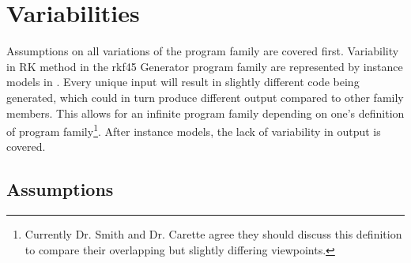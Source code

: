 \documentclass[12pt]{article}
\newcommand{\famname}{rkf45 Generator} %
\begin{document}
\section{Variabilities}

Assumptions on all variations of the program family are covered first.
Variability in RK method in the \famname{} program family are represented by
instance models in . Every unique input will result in
slightly different code being generated, which could in turn produce different
output compared to other family members. This allows for an infinite program
family depending on one's definition of program family\footnote{Currently
  Dr. Smith and Dr. Carette agree they should discuss this definition to compare
  their overlapping but slightly differing viewpoints. }. After instance models, the lack of
variability in output is covered.

\subsection{Assumptions}\label{ssec:Assumptions}
\end{document}
